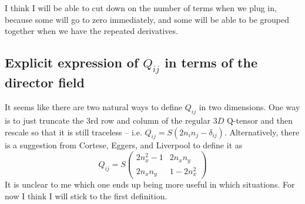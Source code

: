 \documentclass[reqno]{article}
\begin{document}
	I think I will be able to cut down on the number of terms when we plug in, because some will go to zero immediately, and some will be able to be grouped together when we have the repeated derivatives. 
	
	\subsection{Explicit expression of $Q_{ij}$ in terms of the director field}
	It seems like there are two natural ways to define $Q_{ij}$ in two dimensions. One  way is to just truncate the 3rd row and column of the regular $3D$ Q-tensor and then rescale so that it is still traceless -- i.e. $Q_{ij} = S(2n_i n_j - \delta_{ij})$. Alternatively, there is a suggestion from Cortese, Eggers, and Liverpool to define it as
	\begin{equation}
		Q_{ij} = S
		\begin{pmatrix}
		2n_x^2 - 1 & 2n_x n_y \\
		2n_x n_y & 1 - 2n_x^2
		\end{pmatrix}
	\end{equation}
	It is unclear to me which one ends up being more useful in which situations. For now I think I will stick to the first definition. 
	
\end{document}
